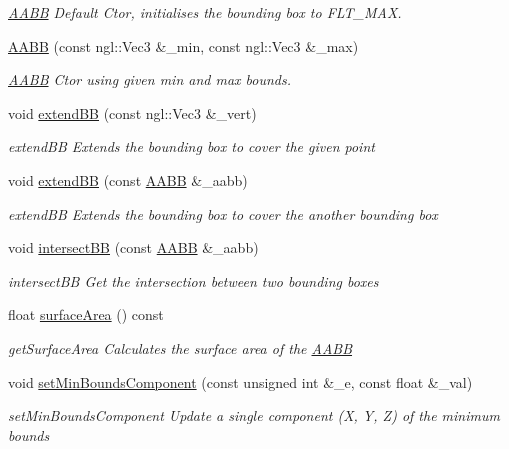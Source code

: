 \begin{DoxyCompactItemize}
\begin{DoxyCompactList}\small\item\em \hyperlink{classAABB}{A\-A\-B\-B} Default Ctor, initialises the bounding box to F\-L\-T\-\_\-\-M\-A\-X. \end{DoxyCompactList}\item 
\hyperlink{classAABB_aebc3dec2dcdc49208a136e03f30c18e4}{A\-A\-B\-B} (const ngl\-::\-Vec3 \&\-\_\-min, const ngl\-::\-Vec3 \&\-\_\-max)
\begin{DoxyCompactList}\small\item\em \hyperlink{classAABB}{A\-A\-B\-B} Ctor using given min and max bounds. \end{DoxyCompactList}\item 
void \hyperlink{classAABB_a688c90b12f49542da1df7b8e56cf7f0e}{extend\-B\-B} (const ngl\-::\-Vec3 \&\-\_\-vert)
\begin{DoxyCompactList}\small\item\em extend\-B\-B Extends the bounding box to cover the given point \end{DoxyCompactList}\item 
void \hyperlink{classAABB_a32895a3235621785fec386b7d0036faa}{extend\-B\-B} (const \hyperlink{classAABB}{A\-A\-B\-B} \&\-\_\-aabb)
\begin{DoxyCompactList}\small\item\em extend\-B\-B Extends the bounding box to cover the another bounding box \end{DoxyCompactList}\item 
void \hyperlink{classAABB_a18b1080e6e8b766628e6c1d13308706b}{intersect\-B\-B} (const \hyperlink{classAABB}{A\-A\-B\-B} \&\-\_\-aabb)
\begin{DoxyCompactList}\small\item\em intersect\-B\-B Get the intersection between two bounding boxes \end{DoxyCompactList}\item 
float \hyperlink{classAABB_ac377b6dc6c264aa80edea4725f098f9b}{surface\-Area} () const 
\begin{DoxyCompactList}\small\item\em get\-Surface\-Area Calculates the surface area of the \hyperlink{classAABB}{A\-A\-B\-B} \end{DoxyCompactList}\item 
void \hyperlink{classAABB_a357bd9e9ece6a77a2d7d6b92c881c214}{set\-Min\-Bounds\-Component} (const unsigned int \&\-\_\-e, const float \&\-\_\-val)
\begin{DoxyCompactList}\small\item\em set\-Min\-Bounds\-Component Update a single component (X, Y, Z) of the minimum bounds \end{DoxyCompactList}\item 

\end{DoxyCompactItemize}
